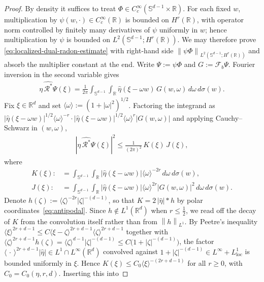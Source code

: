 \documentclass[12pt]{article}
\numberwithin{equation}{section}
\numberwithin{figure}{section}
\numberwithin{equation}{section}
\newcommand{\R}{\mathbb{R}}
\newcommand{\Sph}{\mathbb S}
\newcommand{\norm}[1]{\left\|#1\right\|}
\begin{document}
\begin{proof}
By density it suffices to treat $\Phi\in C_c^\infty(\Sph^{d-1}\times\R)$. For each
fixed $w$, multiplication by $\psi(w,\cdot)\in C_c^\infty(\R)$ is bounded on
$H^r(\R)$, with operator norm controlled by finitely many derivatives of $\psi$
uniformly in $w$; hence multiplication by $\psi$ is bounded on
$L^2(\Sph^{d-1};H^r(\R))$. We may therefore prove
\eqref{eq:localized-dual-radon-estimate} with right-hand side
$\norm{\psi\Phi}_{L^2(\Sph^{d-1};H^r(\R))}$ and absorb the multiplier constant at
the end. Write $\Psi:=\psi\Phi$ and $G:=\mathcal F_b\Psi$. Fourier inversion in the
second variable gives
\begin{align*}
    \widehat{\eta\,\mathcal R^*\Psi}(\xi)
    =\frac1{2\pi}\int_{\Sph^{d-1}}\int_\R
    \widehat\eta(\xi-\omega w)\,G(w,\omega)\,d\omega\,d\sigma(w).
\end{align*}
Fix $\xi\in\R^d$ and set $\langle\omega\rangle:=(1+|\omega|^2)^{1/2}$. Factoring the
integrand as
$|\widehat\eta(\xi-\omega w)|^{1/2}\langle\omega\rangle^{-r}
\cdot|\widehat\eta(\xi-\omega w)|^{1/2}\langle\omega\rangle^{r}|G(w,\omega)|$
and applying Cauchy--Schwarz in $(w,\omega)$,
\begin{align}
    |\widehat{\eta\,\mathcal R^*\Psi}(\xi)|^2
    \le\frac1{(2\pi)^2}\,K(\xi)\,J(\xi),
    \label{eq:CS-split}
\end{align}
where
\begin{align*}
    K(\xi):&=\int_{\Sph^{d-1}}\int_\R|\widehat\eta(\xi-\omega w)|
\langle\omega\rangle^{-2r}\,d\omega\,d\sigma(w), \\
    J(\xi):&=\int_{\Sph^{d-1}}\int_\R|\widehat\eta(\xi-\omega w)|
\langle\omega\rangle^{2r}|G(w,\omega)|^2\,d\omega\,d\sigma(w).
\end{align*}
Denote $h(\zeta):=\langle\zeta\rangle^{-2r}|\zeta|^{-(d-1)}$, so that
$K=2\,|\widehat\eta|*h$ by polar coordinates~\eqref{eq:antipodal}. Since
$h\notin L^1(\R^d)$ when $r\le\tfrac12$, we read off the decay of $K$ from the
convolution itself rather than from $\norm{h}_{L^1}$. By Peetre's inequality
$\langle\xi\rangle^{2r+d-1}\le C\langle\xi-\zeta\rangle^{2r+d-1}
\langle\zeta\rangle^{2r+d-1}$ together with
$\langle\zeta\rangle^{2r+d-1}h(\zeta)=\langle\zeta\rangle^{d-1}|\zeta|^{-(d-1)}
\le C\bigl(1+|\zeta|^{-(d-1)}\bigr)$, the factor
$\langle\,\cdot\,\rangle^{2r+d-1}|\widehat\eta|\in L^1\cap L^\infty(\R^d)$
convolved against $1+|\zeta|^{-(d-1)}\in L^\infty+L^1_{\mathrm{loc}}$ is bounded
uniformly in $\xi$. Hence $K(\xi)\le C_0\langle\xi\rangle^{-(2r+d-1)}$ for all
$r\ge0$, with $C_0=C_0(\eta,r,d)$. Inserting this into

\end{proof}
\end{document}

